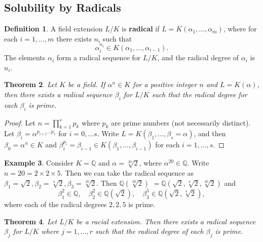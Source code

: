 \documentclass[12pt]{article}
\newtheorem{theorem}{Theorem}
\theoremstyle{definition}
\newtheorem{definition}[theorem]{Definition}
\newtheorem{example}[theorem]{Example}
\begin{document}
\subsection{Solubility by Radicals}
\begin{definition} \label{def:radical-extension}
    A field extension $L / K$ is \textbf{radical} if $L=K\left(\alpha_1, \ldots, \alpha_m\right)$, where for each $i=1, \ldots, m$ there exists $n_i$ such that
$$
\alpha_i^{n_i} \in K\left(\alpha_1, \ldots, \alpha_{i-1}\right).
$$
The elements $\alpha_i$ form a radical sequence for $L / K$, and the radical degree of $\alpha_i$ is $n_i$.
\end{definition}

\begin{theorem} \label{thm:radical-single-prime}
    Let $K$ be a field. If $\alpha ^ n \in K$ for a positive integer $n$ and  $L = K (\alpha)$, then there exists a radical sequence $\beta_i$ for $L / K$ such that the radical degree for each $\beta_i$ is prime.
\end{theorem}

\begin{proof}
    Let $n = \prod_{k=1}^{s} p_{k}$ where $p_{k}$ are prime numbers (not necessarily distinct). Let $\beta_{i} = \alpha^ {p_{i + 1} \dots  p_{s}}$ for $i = 0, \dots s$. Write $L = K(\beta_1,  \dots, \beta_s = \alpha)$, and then $\beta_0 = \alpha^n \in K$ and  $\beta_i ^ {p_i} = \beta_{i-1} \in K(\beta_1, \dots, \beta_{i - 1})$ for each $i  = 1, \dots, s$. 
\end{proof}

\begin{example}
    Consider $K  = \mathbb Q$ and $\alpha = \sqrt[20]{2}$, where $\alpha ^ {20} \in \mathbb Q$. Write $n = 20 =  2 \times 2 \times 5 $. Then we can take the radical sequence as $\beta_1 = \sqrt 2, \beta_2 = \sqrt[4]{2}, \beta_3 = \sqrt[20]{2}$. Then $\mathbb Q(\sqrt[20]{2}) $ $= \mathbb Q(\sqrt{2}, \sqrt[4]{2}, \sqrt[20]{2})$ and 
    $$
    \beta_1 ^ 2 \in \mathbb Q, \quad \beta_2 ^ 2 \in \mathbb Q(\sqrt{2}), \quad \beta_3^5 \in \mathbb Q (\sqrt{2}, \sqrt[4]{2}),
    $$
    where each of the radical degrees $2, 2, 5$ is prime.
\end{example}

\begin{theorem} \label{thm:radical-all-prime}
    Let $L / K$ be a racial extension. Then there exists a radical sequence $\beta_j$ for $L / K$ where $j=1, \dots, r$ such that the radical degree of each $\beta_j$ is prime.
\end{theorem}
\end{document}
